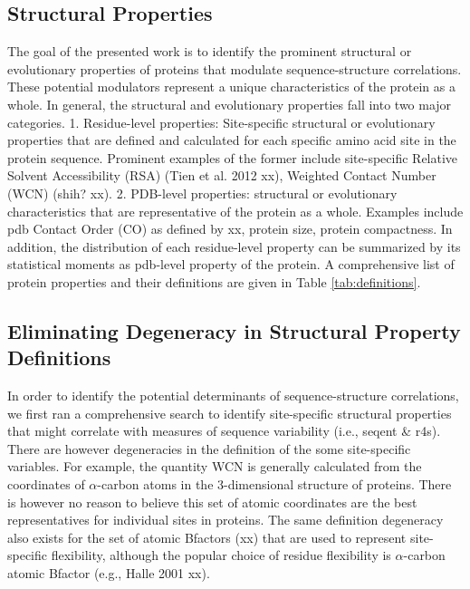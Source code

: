 \documentclass[11pt]{article}
\begin{document}
    \subsection*{Structural Properties}

    The goal of the presented work is to identify the prominent structural or evolutionary properties of proteins that modulate sequence-structure correlations. These potential modulators represent a unique characteristics of the protein as a whole.  In general, the structural and evolutionary properties fall into two major categories. 1. Residue-level properties: Site-specific structural or evolutionary properties that are defined and calculated for each specific amino acid site in the protein sequence. Prominent examples of the former include site-specific Relative Solvent Accessibility (RSA) (Tien et al. 2012 xx), Weighted Contact Number (WCN) (shih? xx).   2. PDB-level properties: structural or evolutionary characteristics that are representative of the protein as a whole. Examples include pdb Contact Order (CO) as defined by xx, protein size, protein compactness.  In addition, the distribution of each residue-level property can be summarized by its statistical moments as pdb-level property of the protein. A comprehensive list of protein properties and their definitions are given in Table \ref{tab:definitions}.

    \subsection*{Eliminating Degeneracy in Structural Property Definitions}

    In order to identify the potential determinants of sequence-structure correlations, we first ran a comprehensive search to identify site-specific structural properties that might correlate with measures of sequence variability (i.e., seqent \& r4s). There are however degeneracies in the definition of the some site-specific variables. For example, the quantity WCN is generally calculated from the coordinates of $\alpha$-carbon atoms in the 3-dimensional structure of proteins. There is however no reason to believe this set of atomic coordinates are the best representatives for individual sites in proteins. The same definition degeneracy also exists for the set of atomic Bfactors (xx) that are used to represent site-specific flexibility, although the popular choice of residue flexibility is $\alpha$-carbon atomic Bfactor (e.g., Halle 2001 xx).
    \\
\end{document}
